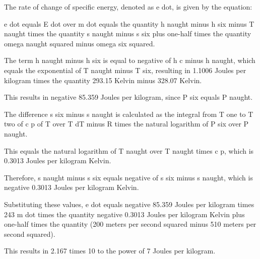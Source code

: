 The rate of change of specific energy, denoted as e dot, is given by the equation:

e dot equals E dot over m dot equals the quantity h naught minus h six minus T naught times the quantity s naught minus s six plus one-half times the quantity omega naught squared minus omega six squared.

The term h naught minus h six is equal to negative of h c minus h naught, which equals the exponential of T naught minus T six, resulting in 1.1006 Joules per kilogram times the quantity 293.15 Kelvin minus 328.07 Kelvin.

This results in negative 85.359 Joules per kilogram, since P six equals P naught.

The difference s six minus s naught is calculated as the integral from T one to T two of c p of T over T dT minus R times the natural logarithm of P six over P naught.

This equals the natural logarithm of T naught over T naught times c p, which is 0.3013 Joules per kilogram Kelvin.

Therefore, s naught minus s six equals negative of s six minus s naught, which is negative 0.3013 Joules per kilogram Kelvin.

Substituting these values, e dot equals negative 85.359 Joules per kilogram times 243 m dot times the quantity negative 0.3013 Joules per kilogram Kelvin plus one-half times the quantity (200 meters per second squared minus 510 meters per second squared).

This results in 2.167 times 10 to the power of 7 Joules per kilogram.